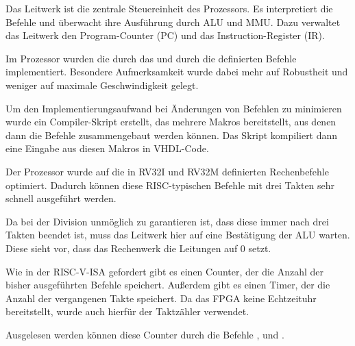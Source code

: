 Das Leitwerk ist die zentrale Steuereinheit des Prozessors. Es interpretiert
die Befehle und \"uberwacht ihre Ausf\"uhrung durch ALU und MMU. Dazu verwaltet
das Leitwerk den Program-Counter (PC) und das Instruction-Register (IR).

Im Prozessor wurden die durch das 
und durch die  definierten Befehle implementiert. Besondere Aufmerksamkeit wurde
dabei mehr auf Robustheit und weniger auf maximale Geschwindigkeit gelegt.

Um den Implementierungsaufwand bei \"Anderungen von Befehlen zu minimieren
wurde ein Compiler-Skript erstellt, das mehrere Makros bereitstellt, aus denen
dann die Befehle zusammengebaut werden k\"onnen. Das Skript kompiliert dann
eine Eingabe aus diesen Makros in VHDL-Code.





Der Prozessor wurde auf die in RV32I und RV32M definierten Rechenbefehle
optimiert. Dadurch k\"onnen diese RISC-typischen Befehle mit drei Takten sehr
schnell ausgef\"uhrt werden.

Da bei der Division unm\"oglich zu garantieren ist, dass diese immer nach drei
Takten beendet ist, muss das Leitwerk hier auf eine Best\"atigung der ALU
warten. Diese sieht vor, dass das Rechenwerk die Leitungen 
auf 0 setzt.


Wie in der RISC-V-ISA gefordert gibt es einen Counter, der die Anzahl der
bisher ausgef\"uhrten Befehle speichert. Au\ss{}erdem gibt es einen Timer, der
die Anzahl der vergangenen Takte speichert. Da das FPGA keine Echtzeituhr
bereitstellt, wurde auch hierf\"ur der Taktz\"ahler verwendet.

Ausgelesen werden k\"onnen diese Counter durch die Befehle \nolinebreak{},
 und .

